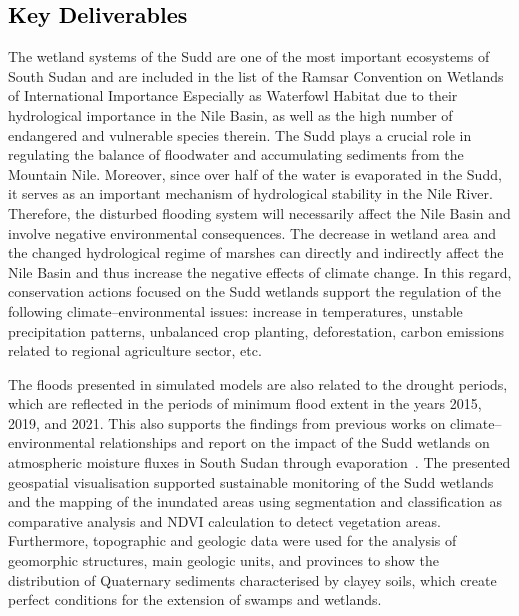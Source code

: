 \documentclass[analytics,article,accept,pdftex,moreauthors]{Definitions/mdpi}
\begin{document}
\subsection{\textcolor{black}{Key Deliverables}}
{The wetland systems of the Sudd} are one of the most important ecosystems of South Sudan and are included in the list of the Ramsar Convention on Wetlands of International Importance Especially as Waterfowl Habitat %
 due to their hydrological importance in the Nile Basin, as well as the high number of  endangered and vulnerable species therein. The Sudd plays a crucial role in regulating the balance of floodwater and accumulating sediments from the Mountain Nile. Moreover, since over half of the water is evaporated in the Sudd, it serves as an important mechanism of hydrological stability in the Nile River. Therefore, the disturbed flooding system will necessarily affect the Nile Basin and involve negative environmental consequences. The decrease in wetland area and the changed hydrological regime of marshes can directly and indirectly affect the Nile Basin and thus increase the negative effects of climate change. In this regard, conservation actions focused on the Sudd wetlands support the regulation of the following climate--environmental issues: increase in temperatures, unstable precipitation patterns, unbalanced crop planting, deforestation, carbon emissions related to regional agriculture sector, etc. %

The floods presented in simulated models are also related to the drought periods, which are reflected in the periods of  minimum flood extent in the years 2015, 2019, and 2021. %
This also supports the findings from previous works on climate--environmental relationships and report on the impact of the Sudd wetlands on atmospheric moisture fluxes in South Sudan through evaporation~\cite{Mohamed}. %
The presented geospatial visualisation supported sustainable monitoring of the Sudd wetlands and the mapping of the inundated areas using segmentation and classification as comparative analysis and NDVI calculation to detect vegetation areas. %
Furthermore,  topographic and geologic data were used for the analysis of geomorphic structures, main geologic units, and provinces to show the distribution of Quaternary sediments characterised by clayey soils, which create perfect conditions for the extension of swamps and wetlands.  %
\end{document}
